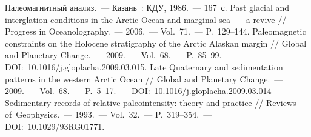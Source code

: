 \begin{thebibliography}{99}
\bibitem{} Палеомагнитный анализ.~--- Казань~: КДУ, 1986.~--- 167~с.
\bibitem{} Past glacial and interglation conditions in the Arctic Ocean and marginal sea~--- a revive // Progress in Oceanolography.~--- 2006.~--- Vol.~71.~--- P.~129--144.
\bibitem{} Paleomagnetic constraints on the Holocene stratigraphy of the Arctic Alaskan margin // Global and Planetary Change.~--- 2009.~--- Vol.~68.~--- P.~85--99.~--- DOI:~10.1016/j.gloplacha.2009.03.015.
\bibitem{} Late Quaternary and sedimentation patterns in the western Arctic Ocean // Global and Planetary Change.~--- 2009.~--- Vol.~68.~--- P.~5--17.~--- DOI:~10.1016/j.gloplacha.2009.03.014
\bibitem{} Sedimentary records of relative paleointensity: theory and practice // Reviews of~Geophysics.~--- 1993.~--- Vol.~32.~--- P.~319--354.~--- DOI:~10.1029/93RG01771.

\end{thebibliography}
\thispagestyle{empty}
